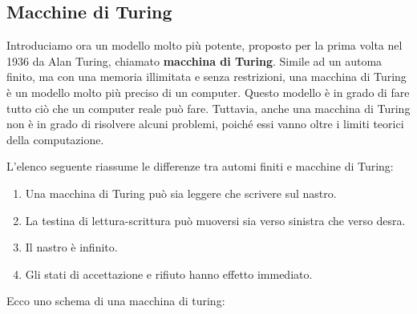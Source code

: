 \documentclass{article}
\begin{document}
\subsection{Macchine di Turing}

Introduciamo ora un modello molto più potente, proposto per la prima volta nel 1936 da Alan Turing, chiamato \textbf{macchina di Turing}. Simile ad un automa finito, ma con una memoria illimitata e senza restrizioni, una macchina di Turing è un modello molto più preciso di un computer. Questo modello è in grado di fare tutto ciò che un computer reale può fare. Tuttavia, anche una macchina di Turing non è in grado di risolvere alcuni problemi, poiché essi vanno oltre i limiti teorici della computazione.

L'elenco seguente riassume le differenze tra automi finiti e macchine di Turing:

\begin{enumerate}
    \item Una macchina di Turing può sia leggere che scrivere sul nastro.
    \item La testina di lettura-scrittura può muoversi sia verso sinistra che verso desra.
    \item Il nastro è infinito.
    \item Gli stati di accettazione e rifiuto hanno effetto immediato.
\end{enumerate}

Ecco uno schema di una macchina di turing:
\end{document}
